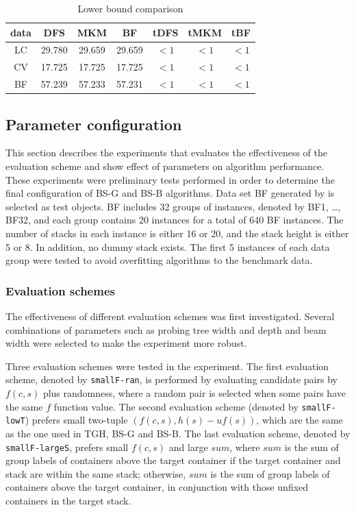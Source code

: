 \documentclass[review,3p,times,authoryear,12pt]{elsarticle}
\begin{document}
\begin{table}[!htb]
\centering
\caption{\label{tab:lowerbound} Lower bound comparison}
\begin{tabular}{c|c|c|c|c|c|c}
    \hline
    data &    DFS     &     MKM   &   BF     & tDFS    & tMKM   & tBF \\
    \hline
    LC       &   29.780   &   29.659  &  29.659  & $<1$    & $<1$   & $<1$ \\
    CV       &   17.725   &   17.725  &  17.725  & $<1$    & $<1$   & $<1$ \\
    BF       &   57.239   &   57.233  &  57.231  & $<1$    & $<1$   & $<1$ \\
    \hline
    \end{tabular}%

\end{table}

\subsection {Parameter configuration}
\label{sub:config}

This section describes the experiments that evaluates the effectiveness of the evaluation scheme and show effect of parameters on algorithm performance.
These experiments were preliminary tests performed in order to determine the final configuration of BS-G and BS-B algorithms. Data set BF generated by \cite{BF2012} is selected as test objects. BF includes 32 groups of instances, denoted by BF1, \dots, BF32, and each group contains 20 instances for a total of 640 BF instances.
The number of stacks in each instance is either 16 or 20, and the stack height is either 5 or 8.
In addition, no dummy stack exists.
The first 5 instances of each data group were tested to avoid overfitting algorithms to the benchmark data.

\subsubsection{Evaluation schemes}

The effectiveness of different evaluation schemes was first investigated.
Several combinations of parameters such as probing tree width and depth and beam width were selected to make the experiment more robust.

Three evaluation schemes were tested in the experiment.
The first evaluation scheme, denoted by \texttt{smallF-ran}, is performed by evaluating candidate pairs by $f(c,s)$ plus randomness, where a random pair is selected when some pairs have the same $f$ function value.
The second evaluation scheme (denoted by \texttt{smallF-lowT}) prefers small two-tuple $(f(c,s),h(s)-\mathit{uf}(s))$, which are the same as the one used in TGH, BS-G and BS-B.
The last evaluation scheme, denoted by \texttt{smallF-largeS}, prefers small $f(c,s)$ and large $\mathit{sum}$, where $\mathit{sum}$ is the sum of group labels of containers above the target container if the target container and stack are within the same stack; otherwise, $\mathit{sum}$ is the sum of group labels of containers above the target container, in conjunction with those unfixed containers in the target stack.
\end{document}
